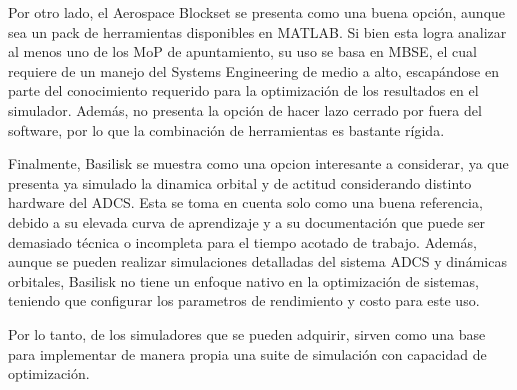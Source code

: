 Por otro lado, el Aerospace Blockset se presenta como una buena opción, aunque sea un pack de herramientas disponibles en MATLAB. Si bien esta logra analizar al menos uno de los MoP de apuntamiento, su uso se basa en MBSE, el cual requiere de un manejo del Systems Engineering de medio a alto, escapándose en parte del conocimiento requerido para la optimización de los resultados en el simulador. Además, no presenta la opción de hacer lazo cerrado por fuera del software, por lo que la combinación de herramientas es bastante rígida.

Finalmente, Basilisk se muestra como una opcion interesante a considerar, ya que presenta ya simulado la dinamica orbital y de actitud considerando distinto hardware del ADCS. Esta se toma en cuenta solo como una buena referencia, debido a su elevada curva de aprendizaje y a su documentación que puede ser demasiado técnica o incompleta para el tiempo acotado de trabajo. Además, aunque se pueden realizar simulaciones detalladas del sistema ADCS y dinámicas orbitales, Basilisk no tiene un enfoque nativo en la optimización de sistemas, teniendo que configurar los parametros de rendimiento y costo para este uso.

Por lo tanto, de los simuladores que se pueden adquirir, sirven como una base para implementar de manera propia una suite de simulación con capacidad de optimización.